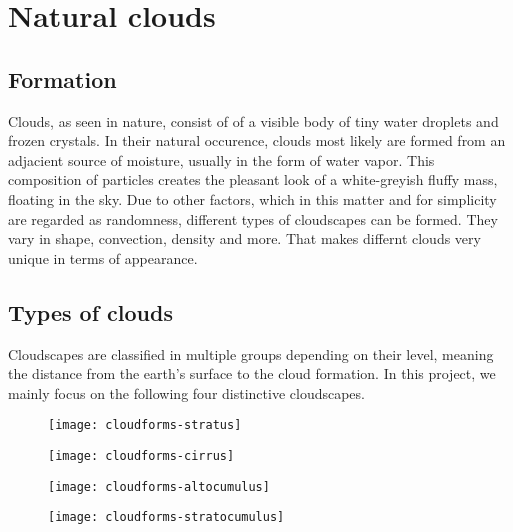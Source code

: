 \section{Natural clouds}

\subsection{Formation}
Clouds, as seen in nature, consist of of a visible body of tiny water droplets and frozen crystals. 
In their natural occurence, clouds most likely are formed from an adjacient source of moisture, usually in the form of water vapor. 
This composition of particles creates the pleasant look of a white-greyish fluffy mass, floating in the sky.
Due to other factors, which in this matter and for simplicity are regarded as randomness, different types of cloudscapes can be formed. They vary in shape, convection, density and more.
That makes differnt clouds very unique in terms of appearance.


\subsection{Types of clouds}
Cloudscapes are classified in multiple groups depending on their level, meaning the distance from the earth's surface to the cloud formation.
In this project, we mainly focus on the following four distinctive cloudscapes.
\begin{figure}[ht]
    \centering
        \begin{minipage}{0.47\linewidth}
            \texttt{[image: cloudforms-stratus]}
            \label{img:photo:cloudforms-stratus}        
        \end{minipage}        
    \hfill
        \begin{minipage}{0.47\linewidth}
            \texttt{[image: cloudforms-cirrus]}
            \label{img:photo:cloudforms-cirrus}        
        \end{minipage}
\end{figure}

\begin{figure}[ht]
    \centering
        \begin{minipage}{0.47\linewidth}
            \texttt{[image: cloudforms-altocumulus]}
            \label{img:photo:cloudforms-altocumulus}        
        \end{minipage}        
    \hfill
        \begin{minipage}{0.47\linewidth}
            \texttt{[image: cloudforms-stratocumulus]}
            \label{img:photo:cloudforms-stratocumulus}        
        \end{minipage}  
\end{figure}